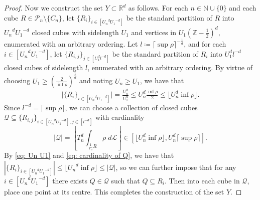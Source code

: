 \documentclass{article}
\newcommand{\R}{\mathbb{R}}
\newcommand{\Z}{\mathbb{Z}}
\newcommand{\N}{\mathbb{N}}
\begin{document}
\begin{proof}
    Now we construct the set $Y \subset \R^d$ as follows. For each $n \in \N \cup \{0\}$ and each cube $R \in \mathcal{P}_n \setminus \{C_n\}$, let $\{R_i\}_{i \in [{U_n}^d{U_1}^{-d}]}$ be the standard partition of $R$ into ${U_n}^d{U_1}^{-d}$ closed cubes with sidelength $U_1$ and vertices in $U_1(\Z-\frac{1}{2})^d,$ enumerated with an arbitrary ordering. Let $l \coloneqq {\lceil \sup \rho}\rceil^{-\frac{1}{d}}$, and for each $i \in [{U_n}^d{U_1}^{-d}]$, let $\{R_{i,j}\}_{j\in [U_1^dl^{-d}]}$ be the standard partition of $R_i$ into $U_1^dl^{-d}$ closed cubes of sidelength $l$, enumerated with an arbitrary ordering. By virtue of choosing $U_1 \geq (\frac{2}{\inf \rho})^\frac{1}{d}$ and noting $U_n \geq U_1$, we have that
    \begin{equation} \label{eq: Un U1}
        \bigg|\{R_i\}_{i \in [{U_n}^d{U_1}^{-d}]}\bigg|  =\tfrac{U_n^d}{U_1^d} \leq U_n^d \tfrac{\inf \rho}{2} \leq \lfloor U_n^d \inf \rho\rfloor.
    \end{equation} 
    Since $l^{-d} = \lceil \sup \rho\rceil$,
we can choose a collection of closed cubes $\mathcal{Q} \subseteq \{R_{i,j}\}_{i\in [{U_n}^d{U_1}^{-d}],j \in [l^{-d}]}$ with cardinality 
\begin{equation} \label{eq: cardinality of Q}
    |\mathcal{Q}| = \left\lfloor T_n^d\int_{\tfrac{1}{T_n}R}\rho \; d\mathcal{L}\right\rfloor \in [\lfloor U_n^d \inf \rho\rfloor, U_n^d \lceil \sup \rho \rceil].
\end{equation}
By \eqref{eq: Un U1} and \eqref{eq: cardinality of Q}, we have that $|\{R_i\}_{i \in [{U_n}^d{U_1}^{-d}]}| \leq \lfloor {U_n}^d \inf \rho\rfloor \leq|\mathcal{Q}|$, so we can further impose that for any $i \in [{U_n}^d{U_1}^{-d}]$ there exists $Q \in \mathcal{Q}$ such that $Q \subseteq R_i.$
    Then into each cube in $\mathcal{Q}$, place one point at its centre. This completes the construction of the set $Y.$
    

\end{proof}
\end{document}
